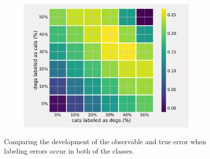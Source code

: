 \documentclass[a4paper,11pt]{scrartcl}
\theoremstyle{definition}
\begin{document}
\begin{figure}
\begin{subfigure}[t]{0.32\textwidth}
\includegraphics[width=0.97\textwidth]{Plots_2/3000_difference_images_new.pdf}
\label{subfig:cross_mislabel_difference_heatmap}
\end{subfigure}
\caption[Heatmaps comparing error rates in training with labeling errors in both classes.]{Comparing the development of the observable and true error when labeling errors occur in both of the classes.}
\label{fig:cross_mislabel_heatmaps}
\end{figure}

%
\end{document}
